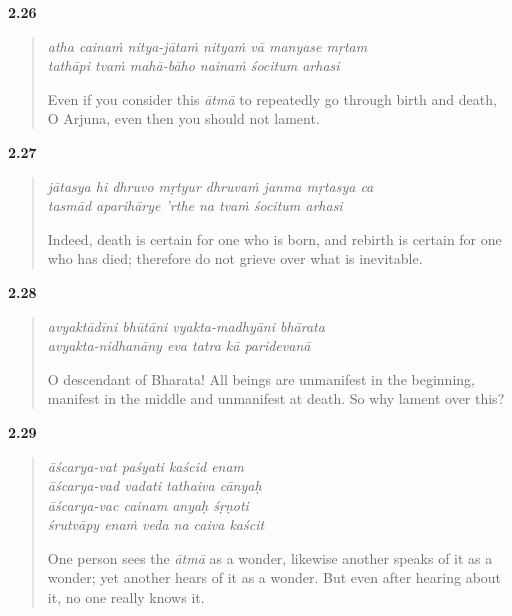 \par\noindent\textbf{2.26}\par
\begin{verse}
\textit{atha cainaṁ nitya-jātaṁ nityaṁ vā manyase mṛtam} \\
\textit{tathāpi tvaṁ mahā-bāho nainaṁ śocitum arhasi}

\noindent Even if you consider this \textit{ātmā} to repeatedly go through birth and death, O Arjuna, even then you should not lament.
\end{verse}
\par



\par\noindent\textbf{2.27}\par
\begin{verse}
\textit{jātasya hi dhruvo mṛtyur dhruvaṁ janma mṛtasya ca} \\
\textit{tasmād aparihārye ’rthe na tvaṁ śocitum arhasi}

\noindent Indeed, death is certain for one who is born, and rebirth is certain for one who has died; therefore do not grieve over what is inevitable.
\end{verse}
\par



\par\noindent\textbf{2.28}\par
\begin{verse}
\textit{avyaktādīni bhūtāni vyakta-madhyāni bhārata} \\
\textit{avyakta-nidhanāny eva tatra kā paridevanā}

\noindent O descendant of Bharata! All beings are unmanifest in the beginning, manifest in the middle and unmanifest at death. So why lament over this?
\end{verse}
\par



\par\noindent\textbf{2.29}\par
\begin{verse}
\textit{āścarya-vat paśyati kaścid enam} \\
\textit{āścarya-vad vadati tathaiva cānyaḥ} \\
\textit{āścarya-vac cainam anyaḥ śṛṇoti} \\
\textit{śrutvāpy enaṁ veda na caiva kaścit}

\noindent One person sees the \textit{ātmā} as a wonder, likewise another speaks of it as a wonder; yet another hears of it as a wonder. But even after hearing about it, no one really knows it.
\end{verse}
\par



